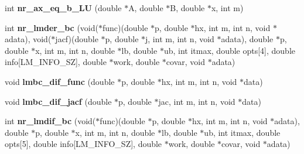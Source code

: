 \begin{CompactItemize}
\item 
int \textbf{nr\_\-ax\_\-eq\_\-b\_\-LU} (double $\ast$A, double $\ast$B, double $\ast$x, int m)\label{group__nr_g50388d5d50f760129a054ea526ed1c07}

\item 
int \textbf{nr\_\-lmder\_\-bc} (void($\ast$func)(double $\ast$p, double $\ast$hx, int m, int n, void $\ast$adata), void($\ast$jacf)(double $\ast$p, double $\ast$j, int m, int n, void $\ast$adata), double $\ast$p, double $\ast$x, int m, int n, double $\ast$lb, double $\ast$ub, int itmax, double opts[4], double info[LM\_\-INFO\_\-SZ], double $\ast$work, double $\ast$covar, void $\ast$adata)\label{nr__levmar_8c_1a6631bd454e7f929d3d6f050d090f48}

\item 
void \textbf{lmbc\_\-dif\_\-func} (double $\ast$p, double $\ast$hx, int m, int n, void $\ast$data)\label{nr__levmar_8c_353a1c2f31d7a4ba23bf49de06f11887}

\item 
void \textbf{lmbc\_\-dif\_\-jacf} (double $\ast$p, double $\ast$jac, int m, int n, void $\ast$data)\label{nr__levmar_8c_afc1acb2a7b662755edf7b0cb0985e75}

\item 
int \textbf{nr\_\-lmdif\_\-bc} (void($\ast$func)(double $\ast$p, double $\ast$hx, int m, int n, void $\ast$adata), double $\ast$p, double $\ast$x, int m, int n, double $\ast$lb, double $\ast$ub, int itmax, double opts[5], double info[LM\_\-INFO\_\-SZ], double $\ast$work, double $\ast$covar, void $\ast$adata)\label{nr__levmar_8c_5218f124b704f39964d9c12592e7f629}

\end{CompactItemize}

